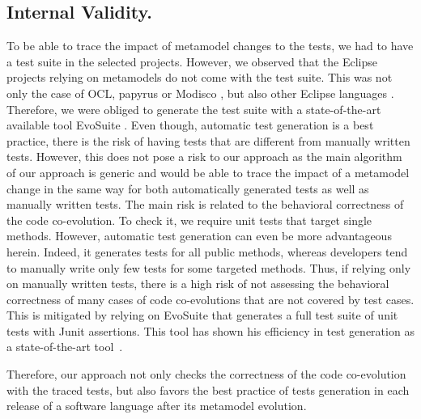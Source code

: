 \subsection{Internal Validity.}
To be able to trace the impact of metamodel changes to the tests, we had to have a test suite in the selected projects. However, we observed that the Eclipse projects relying on metamodels do not come with the test suite. This was not only the case of OCL\cite{MDTOCL}, papyrus \cite{MDTPapyrus} or Modisco \cite{MDTModisco}, but also other Eclipse languages \cite{UML241,BPMN2}. Therefore, we were obliged to generate the test suite with a state-of-the-art available tool EvoSuite \cite{fraser2011evosuite}. 
Even though, automatic test generation is a best practice, there is the risk of having tests that are different from manually written tests. 
However, this does not pose a risk to our approach as the main algorithm of our approach is generic and would be able to trace the impact of a metamodel change in the same way for both automatically generated tests as well as manually written tests.  
The main risk is related to the behavioral correctness of the code co-evolution. To check it, we require unit tests that target single methods. 
However, automatic test generation can even be more advantageous herein. Indeed, it generates tests for all public methods, whereas developers tend to manually write only few tests for some targeted methods. Thus, if relying only on manually written tests, there is a high risk of not assessing the behavioral correctness of many cases of code co-evolutions that are not covered by test cases. 
This is mitigated by relying on EvoSuite that generates a full test suite of unit tests with Junit assertions. This tool has shown his efficiency in test generation as a state-of-the-art tool~\cite{DANGLOT2019110398,https://doi.org/10.1002/stvr.1601}. 

Therefore, our approach not only checks the correctness of the code co-evolution with the traced tests, but also favors the best practice of tests generation in each release of a software language after its metamodel evolution.

